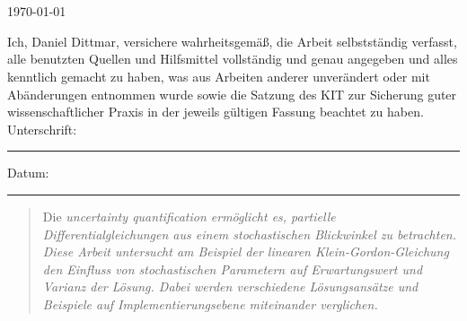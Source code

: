 \documentclass[
11pt, %
ngerman, %
singlespacing, %
headsepline, %
]{MastersDoctoralThesis} %
\begin{document}
\begin{titlepage}
\begin{center}
\vfill


\groupname\\\deptname\\[2cm] %
 
\vfill

{\large \today}\\[4cm] %

 
\vfill
\end{center}
\end{titlepage}


\begin{declaration}
\addchaptertocentry{\authorshipname} %
\noindent Ich, Daniel Dittmar, versichere wahrheitsgemäß, die Arbeit selbstständig verfasst, alle benutzten Quellen und Hilfsmittel vollständig und genau angegeben und alles kenntlich gemacht zu haben, was aus Arbeiten anderer unverändert oder mit Abänderungen entnommen wurde sowie die Satzung des KIT zur Sicherung guter wissenschaftlicher Praxis in der jeweils gültigen Fassung beachtet zu haben.
 \\[0.5cm]
\noindent Unterschrift:\\
\rule[0.5em]{25em}{0.5pt} %
 
\noindent Datum:\\
\rule[0.5em]{25em}{0.5pt} %
\end{declaration}

\cleardoublepage

%
%
%
%

\begin{abstract}
\addchaptertocentry{\abstractname} %
 Die \it{uncertainty quantification} ermöglicht es, partielle Differentialgleichungen aus einem stochastischen Blickwinkel zu betrachten. Diese Arbeit untersucht am Beispiel der linearen Klein-Gordon-Gleichung den Einfluss von stochastischen Parametern auf Erwartungswert und Varianz der Lösung. Dabei werden verschiedene Lösungsansätze und Beispiele auf Implementierungsebene miteinander verglichen.
\end{abstract}
\end{document}
